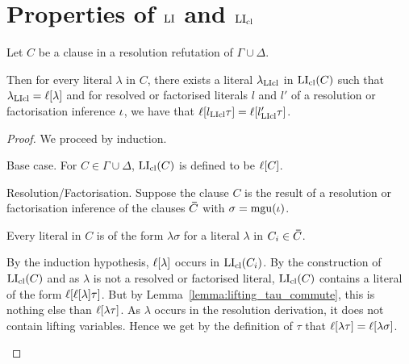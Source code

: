 \documentclass[,%
	draft=false,%
	numbers=noendperiod
	11pt,
	a4paper,
	oneside,%
	openany,
]{memoir}
\begin{document}
\section{Properties of $\operatorname{LI}$ and $\operatorname{LI}_{\operatorname{cl}}$}

\begin{lemma}
	\label{lemma:li_vs_clause_plus_literals_equal}
	Let $C$ be a clause in a resolution refutation of $\Gamma\cup\Delta$.

	Then for every literal $\lambda$ in $C$, there exists a literal $\lambda_{\operatorname{LIcl}}$ in\nolinebreak{} $\operatorname{LI}_{\operatorname{cl}}(C)$ such that $\lambda_{\operatorname{LIcl}} = \ell[\lambda]$ and for resolved or factorised literals $l$ and $l'$ of a resolution or factorisation inference $\iota$, we have that $\ell[l_{\operatorname{LIcl}}\tau] = \ell[l'_{\operatorname{LIcl}}\tau]$.
\end{lemma}
\begin{proof}
	We proceed by induction.
	\begin{description}
		\item{} Base case.
			For $C\in\Gamma\cup\Delta$, $\operatorname{LI}_{\operatorname{cl}}(C)$ is defined to be $\ell[C]$.

		\item{} Resolution/Factorisation.
			Suppose the clause $C$ is the result of a resolution or factorisation inference \inference{} of the clauses $\bm\bar C$ with $\sigma = \operatorname{mgu}(\iota)$.


			Every literal in $C$ is of the form $\lambda\sigma$ for a literal $\lambda$ in $C_i\in\bm\bar C$.

			By the induction hypothesis, $\ell[\lambda]$ occurs in $\operatorname{LI}_{\operatorname{cl}}(C_i)$.
			By the construction of $\operatorname{LI}_{\operatorname{cl}}(C)$ and as $\lambda$ is not a resolved or factorised literal, $\operatorname{LI}_{\operatorname{cl}}(C)$ contains a literal of the form $\ell[\ell[\lambda]\tau]$.
			But by Lemma~\ref{lemma:lifting_tau_commute}, this is nothing else than $\ell[\lambda\tau]$.
			As $\lambda$ occurs in the resolution derivation, it does not contain lifting variables.
			Hence we get by the definition of $\tau$ that $\ell[\lambda\tau] = \ell[\lambda\sigma]$.


\end{description}
\end{proof}
\end{document}
